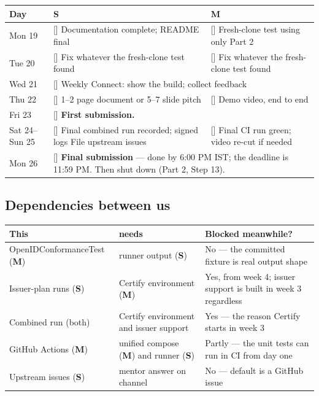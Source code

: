 \documentclass[10pt,a4paper]{article}
\newcommand{\todo}{[\phantom{x}]}
\newcommand{\Sh}{\textbf{S}}
\newcommand{\Mu}{\textbf{M}}
\begin{document}
\begin{longtable}{@{}p{1.9cm}p{6.9cm}p{7.2cm}@{}}
\toprule
Day & \Sh & \Mu\\
\midrule
\endhead
Mon 19 & \todo{} Documentation complete; README final
& \todo{} Fresh-clone test using only Part 2\\
\addlinespace
Tue 20 & \todo{} Fix whatever the fresh-clone test found
& \todo{} Fix whatever the fresh-clone test found\\
\addlinespace
Wed 21 & \multicolumn{2}{p{14.2cm}}{\todo{} Weekly Connect: show the build; collect feedback}\\
\addlinespace
Thu 22 & \todo{} 1--2 page document or 5--7 slide pitch
& \todo{} Demo video, end to end\\
\addlinespace
Fri 23 & \multicolumn{2}{p{14.2cm}}{\todo{} \textbf{First submission.}}\\
\addlinespace
Sat 24--Sun 25 & \todo{} Final combined run recorded; signed logs\newline
\todo{} File upstream issues
& \todo{} Final CI run green; video re-cut if needed\\
\addlinespace
Mon 26 & \multicolumn{2}{p{14.2cm}}{\todo{} \textbf{Final submission} --- done by 6:00 PM IST;
the deadline is 11:59 PM. Then shut down (Part 2, Step 13).}\\
\bottomrule
\end{longtable}

\subsection{Dependencies between us}

\begin{longtable}{@{}p{5.4cm}p{5.2cm}p{5.2cm}@{}}
\toprule
This & needs & Blocked meanwhile?\\
\midrule
\endhead
OpenIDConformanceTest (\Mu) & runner output (\Sh) & No --- the committed fixture is real
output shape\\
Issuer-plan runs (\Sh) & Certify environment (\Mu) & Yes, from week 4; issuer support is
built in week 3 regardless\\
Combined run (both) & Certify environment and issuer support & Yes --- the reason Certify
starts in week 3\\
GitHub Actions (\Mu) & unified compose (\Mu) and runner (\Sh) & Partly --- the unit tests
can run in CI from day one\\
Upstream issues (\Sh) & mentor answer on channel & No --- default is a GitHub issue\\
\bottomrule
\end{longtable}
\end{document}
